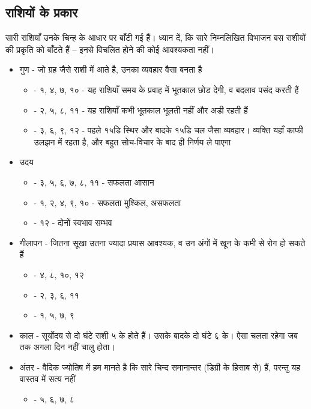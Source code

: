 \subsection[वर्गीकरण]{राशियों के प्रकार} \label{subsec:zeichenart}
सारी राशियाँ उनके चिन्ह के आधार पर बाँटी गई हैं। ध्यान दें, कि सारे निम्नलिखित विभाजन बस राशीयों की प्रकृति को बाँटते हैं -- इनसे विचलित होने की कोई आवश्यकता नहीं।
\begin{itemize}
    \item गुण - जो ग्रह जैसे राशी में आते है, उनका व्यवहार वैसा बनता है \begin{itemize}
        \item {} - १, ४, ७, १० - यह राशियाँ समय के प्रवाह में भूतकाल छोड देगी, व बदलाव पसंद करती हैं
        \item {} - २, ५, ८, ११ - यह राशियाँ कभी भूतकाल भूलती नहीं और अडी रहती हैं
        \item {} - ३, ६, ९, १२ - पहले १५डि स्थिर और बादके १५डि चल जैसा व्यवहार। व्यक्ति यहाँ काफी उलझन में रहता है, और बहुत सोच-विचार के बाद ही निर्णय ले पाएगा
    \end{itemize}
    \item उदय \begin{itemize}
        \item {} - ३, ५, ६, ७, ८, ११ - सफलता आसान
        \item {} - १, २, ४, ९, १० - सफलता मुश्किल, असफलता
        \item {} - १२ - दोनों स्वभाव सम्भव
    \end{itemize}
    \item गीलापन  - जितना सूखा उतना ज्यादा प्रयास आवश्यक, व उन अंगों में खून के कमी से रोग हो सकते हैं \begin{itemize}
        \item {} - ४, ८, १०, १२
        \item {} - २, ३, ६, ११
        \item {} - १, ५, ७, ९
    \end{itemize}
    \item काल - सूर्योदय से दो घंटे राशी ५ के होते हैं। उसके बादके दो घंटे ६ के। ऐसा चलता रहेगा जब तक अगला दिन नहीं चालु होता।
    \item अंतर - वैदिक ज्योतिष में हम मानते है कि सारे चिन्द समानान्तर (डिग्री के हिसाब से) हैं, परन्तु यह वास्तव में सत्य नहीं \begin{itemize}
        \item {} - ५, ६, ७, ८

\end{itemize}
\end{itemize}
